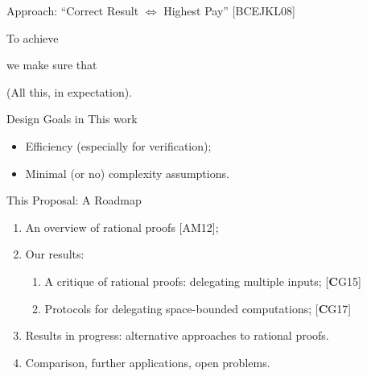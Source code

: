 \begin{frame}{Approach: ``Correct Result $\iff$ Highest Pay'' [BCEJKL08]}
	\onslide<+->
	\begin{block}{\Large{To achieve}}
	\end{block}
	
	\medskip
	\pause
	\begin{block}{\Large{we  make sure that}}
	\end{block}
	\pause
	\alert{(All this, in expectation)}.
	
\end{frame}

\begin{frame}{Design Goals in This work}
\begin{itemize}[<+- | alert@+>]
	\item Efficiency (especially for verification);
	\item Minimal (or no) complexity assumptions.
\end{itemize}
\end{frame}

\begin{frame}{This Proposal: A Roadmap}
	\begin{enumerate}[<+- | alert@+>]
		\item An overview of rational proofs [AM12];
		\item Our results:
		\begin{enumerate}
			\item A critique of rational proofs: delegating multiple inputs; [\textbf{C}G15]
			\item Protocols for delegating space-bounded computations; [\textbf{C}G17]
		\end{enumerate}
		\item Results in progress: alternative approaches to rational proofs.
		\item Comparison, further applications, open problems.
	\end{enumerate}
\end{frame}

